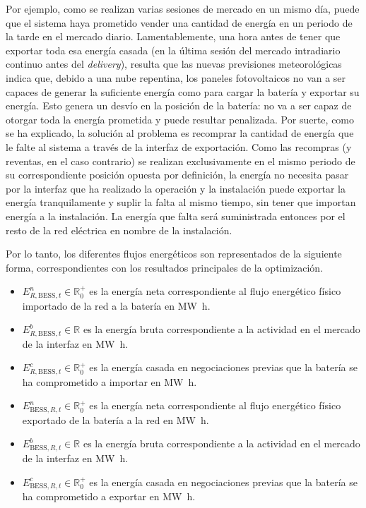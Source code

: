 Por ejemplo, como se realizan varias sesiones de mercado en un mismo día, puede que el sistema haya prometido vender una cantidad de energía en un periodo de la tarde en el mercado diario. Lamentablemente, una hora antes de tener que exportar toda esa energía casada (en la última sesión del mercado intradiario continuo antes del \textit{delivery}), resulta que las nuevas previsiones meteorológicas indica que, debido a una nube repentina, los paneles fotovoltaicos no van a ser capaces de generar la suficiente energía como para cargar la batería y exportar su energía. Esto genera un desvío en la posición de la batería: no va a ser capaz de otorgar toda la energía prometida y puede resultar penalizada. Por suerte, como se ha explicado, la solución al problema es recomprar la cantidad de energía que le falte al sistema a través de la interfaz de exportación. Como las recompras (y reventas, en el caso contrario) se realizan exclusivamente en el mismo periodo de su correspondiente posición opuesta por definición, la energía no necesita pasar por la interfaz que ha realizado la operación y la instalación puede exportar la energía tranquilamente y suplir la falta al mismo tiempo, sin tener que importan energía a la instalación. La energía que falta será suministrada entonces por el resto de la red eléctrica en nombre de la instalación.

Por lo tanto, los diferentes flujos energéticos son representados de la siguiente forma, correspondientes con los resultados principales de la optimización.

\begin{itemize}

  \item \( E^{n}_{R, \text{BESS}, t} \in \mathbb{R}^{+}_{0} \) es la energía neta correspondiente al flujo energético físico importado de la red a la batería en \si{{\mega\watt\hour}}.

  \item \( E^{b}_{R, \text{BESS}, t} \in \mathbb{R} \) es la energía bruta correspondiente a la actividad en el mercado de la interfaz en \si{{\mega\watt\hour}}.

  \item \( E^{c}_{R, \text{BESS}, t} \in \mathbb{R}^{+}_{0} \) es la energía casada en negociaciones previas que la batería se ha comprometido a importar en \si{{\mega\watt\hour}}.

  \item \( E^{n}_{\text{BESS}, R, t} \in \mathbb{R}^{+}_{0} \) es la energía neta correspondiente al flujo energético físico exportado de la batería a la red en \si{{\mega\watt\hour}}.

  \item \( E^{b}_{\text{BESS}, R, t} \in \mathbb{R} \) es la energía bruta correspondiente a la actividad en el mercado de la interfaz en \si{{\mega\watt\hour}}.

  \item \( E^{c}_{\text{BESS}, R, t} \in \mathbb{R}^{+}_{0} \) es la energía casada en negociaciones previas que la batería se ha comprometido a exportar en \si{{\mega\watt\hour}}.

\end{itemize}


